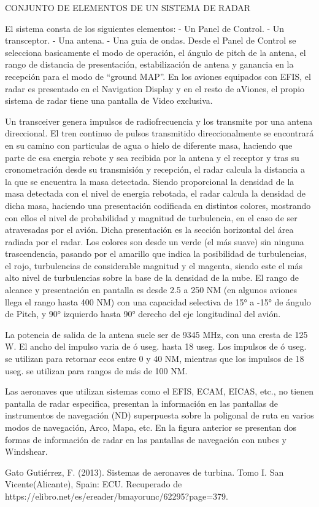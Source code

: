 CONJUNTO DE ELEMENTOS DE UN SISTEMA DE RADAR

El sistema consta de los siguientes elementos: - Un Panel de Control. - Un transceptor. - Una antena. - Una guia de ondas. Desde el Panel de Control se selecciona basicamente el modo de operación, el ángulo de pitch de la antena, el rango de distancia de presentación, estabilización de antena y ganancia en la recepción para el modo de “ground MAP”. En los aviones equipados con EFIS, el radar es presentado en el Navigation Display y en el resto de aViones, el propio sistema de radar tiene una pantalla de Video exclusiva.

Un transceiver genera impulsos de radiofrecuencia y los transmite por una antena direccional. El tren continuo de pulsos transmitido direccionalmente se encontrará en su camino con particulas de agua o hielo de diferente masa, haciendo que parte de esa energia rebote y sea recibida por la antena y el receptor y tras su cronometración desde su transmisión y recepción, el radar calcula la distancia a la que se encuentra la masa detectada. Siendo proporcional la densidad de la masa detectada con el nivel de energia rebotada, el radar calcula la densidad de dicha masa, haciendo una presentación codiﬁcada en distintos colores, mostrando con ellos el nivel de probabilidad y magnitud de turbulencia, en el caso de ser atravesadas por el avión. Dicha presentación es la sección horizontal del área radiada por el radar. Los colores son desde un verde (el más suave) sin ninguna trascendencia, pasando por el amarillo que indica la posibilidad de turbulencias, el rojo, turbulencias de considerable magnitud y el magenta, siendo este el más alto nivel de turbulencias sobre la base de la densidad de la nube. El rango de alcance y presentación en pantalla es desde 2.5 a 250 NM (en algunos aviones llega el rango hasta 400 NM) con una capacidad selectiva de 15° a -15° de ángulo de Pitch, y 90° izquierdo hasta 90° derecho del eje longitudinal del avión.

La potencia de salida de la antena suele ser de 9345 MHz, con una cresta de 125 W. El ancho del impulso varia de ó useg. hasta 18 useg. Los impulsos de ó useg. se utilizan para retornar ecos entre 0 y 40 NM, mientras que los impulsos de 18 useg. se utilizan para rangos de más de 100 NM.

Las aeronaves que utilizan sistemas como el EFIS, ECAM, EICAS, etc., no tienen pantalla de radar especiﬁca, presentan la información en las pantallas de instrumentos de navegación (ND) superpuesta sobre la poligonal de ruta en varios modos de navegación, Arco, Mapa, etc. En la ﬁgura anterior se presentan dos formas de información de radar en las pantallas de navegación con nubes y Windshear.


Gato Gutiérrez, F. (2013). Sistemas de aeronaves de turbina. Tomo I. San Vicente(Alicante), Spain: ECU. Recuperado de https://elibro.net/es/ereader/bmayorunc/62295?page=379.
